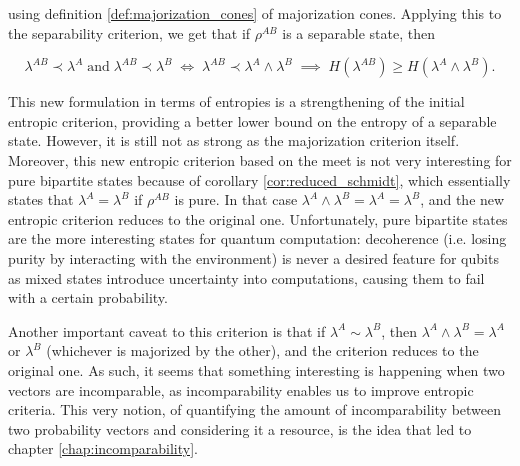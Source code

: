\noindent using definition \ref{def:majorization_cones} of majorization cones. Applying this to the separability criterion, we get that if $\rho^{AB}$ is a separable state, then

\begin{equation}
    \lambda^{AB} \prec \lambda^A \; \text{and} \; \lambda^{AB} \prec \lambda^{B} \; \iff \; \lambda^{AB} \prec \lambda^A \wedge \lambda^B \; \implies \; H(\lambda^{AB}) \geq H(\lambda^A \wedge \lambda^B).
\end{equation}

This new formulation in terms of entropies is a strengthening of the initial entropic criterion, providing a better lower bound on the entropy of a separable state. However, it is still not as strong as the majorization criterion itself. Moreover, this new entropic criterion based on the meet is not very interesting for pure bipartite states because of corollary \ref{cor:reduced_schmidt}, which essentially states that $\lambda^A = \lambda^B$ if $\rho^{AB}$ is pure. In that case $\lambda^A \wedge \lambda^B = \lambda^A = \lambda^B$, and the new entropic criterion reduces to the original one. Unfortunately, pure bipartite states are the more interesting states for quantum computation: decoherence (i.e. losing purity by interacting with the environment) is never a desired feature for qubits as mixed states introduce uncertainty into computations, causing them to fail with a certain probability.

Another important caveat to this criterion is that if $\lambda^A \sim \lambda^B$, then $\lambda^A \wedge \lambda^B = \lambda^A$ or $\lambda^B$ (whichever is majorized by the other), and the criterion reduces to the original one. As such, it seems that something interesting is happening when two vectors are incomparable, as incomparability enables us to improve entropic criteria. This very notion, of quantifying the amount of incomparability between two probability vectors and considering it a resource, is the idea that led to chapter \ref{chap:incomparability}.


